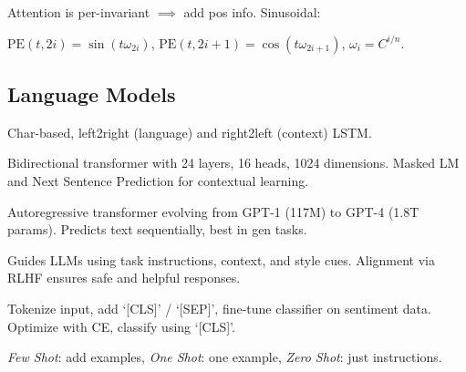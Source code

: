 \begin{definition}
    Attention is per-invariant \(\implies\) add pos info. Sinusoidal:
    
    \(\text{PE}(t, 2i) = \sin(t \omega_{2i})\), \(\text{PE}(t, 2i+1) = \cos(t \omega_{2i+1})\), \(\omega_i = C^{i / n}\).
\end{definition}

\subsection{Language Models}

\begin{definition}[ELMO]
    Char-based, left2right (language) and right2left (context) LSTM.
\end{definition}

\begin{definition}[BERT]
    Bidirectional transformer with 24 layers, 16 heads, 1024 dimensions. Masked LM and Next Sentence Prediction for contextual learning.
\end{definition}

\begin{definition}[GPT]
    Autoregressive transformer evolving from GPT-1 (117M) to GPT-4 (1.8T params). Predicts text sequentially, best in gen tasks.
\end{definition}

\begin{definition}
    Guides LLMs using task instructions, context, and style cues. Alignment via RLHF ensures safe and helpful responses.
\end{definition}

\begin{definition}
    Tokenize input, add `[CLS]' / `[SEP]', fine-tune classifier on sentiment data. Optimize with CE, classify using `[CLS]'.
\end{definition}

\textit{Few Shot}: add examples, \textit{One Shot}: one example, \textit{Zero Shot}: just instructions.

